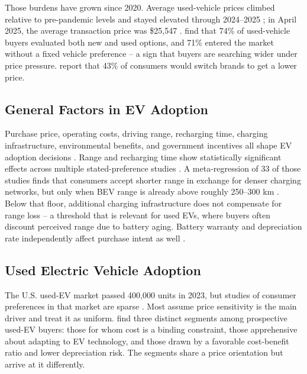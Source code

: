 \documentclass[a4paper,fleqn]{cas-sc}   %
\begin{document}
Those burdens have grown since 2020. Average used-vehicle prices climbed relative to pre-pandemic levels and stayed elevated through 2024--2025 \parencite{cox2024usedvehicle_prices}; in April 2025, the average transaction price was \$25,547 \parencite{kbb2025usedcar_price}. \textcite{cox2025buyerjourney} find that 74\% of used-vehicle buyers evaluated both new and used options, and 71\% entered the market without a fixed vehicle preference -- a sign that buyers are searching wider under price pressure. \textcite{c4analytics2025pricesensitivity} report that 43\% of consumers would switch brands to get a lower price.

\subsection{General Factors in EV Adoption}

Purchase price, operating costs, driving range, recharging time, charging infrastructure, environmental benefits, and government incentives all shape EV adoption decisions \parencite{sagepub2020EVattributes}. Range and recharging time show statistically significant effects across multiple stated-preference studies \parencite{helveston2016EVpreferences}. A meta-regression of 33 of those studies finds that consumers accept shorter range in exchange for denser charging networks, but only when BEV range is already above roughly 250--300 km \parencite{trd2024metaregression}. Below that floor, additional charging infrastructure does not compensate for range loss -- a threshold that is relevant for used EVs, where buyers often discount perceived range due to battery aging. Battery warranty and depreciation rate independently affect purchase intent as well \parencite{trd2019batterywarranty}.

\subsection{Used Electric Vehicle Adoption}

The U.S. used-EV market passed 400,000 units in 2023, but studies of consumer preferences in that market are sparse \parencite{tandf2025usedEV}. Most assume price sensitivity is the main driver and treat it as uniform. \textcite{tandf2025usedEV} find three distinct segments among prospective used-EV buyers: those for whom cost is a binding constraint, those apprehensive about adapting to EV technology, and those drawn by a favorable cost-benefit ratio and lower depreciation risk. The segments share a price orientation but arrive at it differently.
\end{document}

